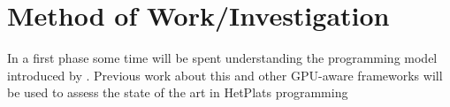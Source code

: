 \section{Method of Work/Investigation}

In a first phase some time will be spent understanding the programming model introduced by \GAMA. Previous work about this and other GPU-aware frameworks will be used to assess the state of the art in HetPlats programming
